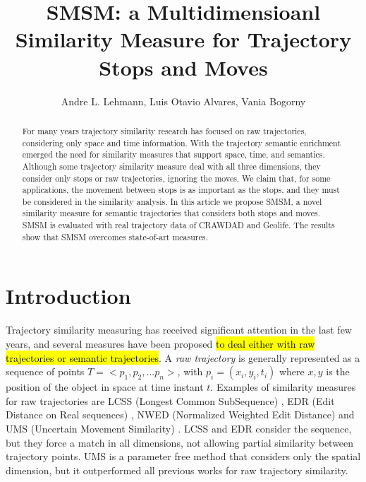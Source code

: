 \documentclass[12pt]{article}
\title{SMSM: a Multidimensioanl Similarity Measure for Trajectory Stops and Moves}
\author{Andre L. Lehmann\inst{1}, Luis Otavio Alvares\inst{1}, Vania Bogorny\inst{1} }
\begin{document}
 

\maketitle

\begin{abstract}
For many years trajectory similarity research has focused on raw trajectories, considering only space and time information. With the trajectory semantic enrichment emerged the need for similarity measures that support space, time, and semantics. Although some trajectory similarity measure deal with all three dimensions, they consider only stops or raw trajectories, ignoring the moves. We claim that, for some applications, the movement between stops is as important as the stops, and they must be considered in the similarity analysis.
  In this article we propose SMSM, a novel similarity measure for semantic trajectories that considers both stops and moves.
  SMSM is evaluated with real trajectory data of CRAWDAD and Geolife. The results show that SMSM overcomes state-of-art measures.
\end{abstract}

\section{Introduction}

Trajectory similarity measuring has received significant attention in the last few years, and several measures have been proposed \hl{to deal either with raw trajectories or semantic trajectories}. A \emph{raw trajectory} is generally represented as a sequence of points $T=<p_1, p_2, ...p_n>$, with $p_i=(x_i,y_i,t_i)$ where $x,y$ is the position of the object in space at time instant $t$.  Examples of similarity measures for raw trajectories are LCSS (Longest Common SubSequence) \citep{vlachos2002discovering}, EDR (Edit Distance on Real sequences) \citep{Chen:2005:RFS:1066157.1066213}, NWED (Normalized Weighted Edit Distance) \citep{dodge2012} and UMS (Uncertain Movement Similarity) \citep{Furtado-UMS-2018}. LCSS \citep{vlachos2002discovering} and EDR \citep{Chen:2005:RFS:1066157.1066213} consider the sequence, but they force a match in all dimensions, not allowing partial similarity between trajectory points.  %
UMS \citep{Furtado-UMS-2018} is a parameter free method that considers only the spatial dimension, but it outperformed all previous works for raw trajectory similarity.
\end{document}
